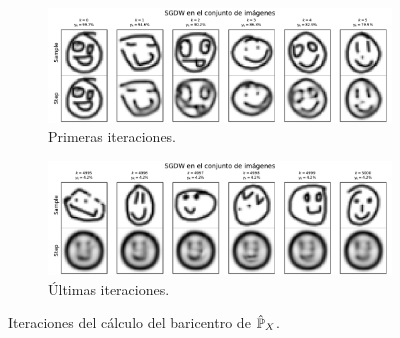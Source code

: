 \begin{figure}[H]
    \centering
    \begin{subfigure}[b]{0.75\textwidth}
        \includegraphics[width=\textwidth]{img/sgdw-iters/first-iters-DS.pdf}
        \caption{Primeras iteraciones.}
        \label{fig:first-iters-DS}
    \end{subfigure}
    \begin{subfigure}[b]{0.75\textwidth}
        \includegraphics[width=\textwidth]{img/sgdw-iters/last-iters-DS.pdf}
        \caption{Últimas iteraciones.}
        \label{fig:last-iters-DS}
    \end{subfigure}
    \caption{Iteraciones del cálculo del baricentro de $\hat\Prob_X$.}
    \label{fig:iters-DS}
\end{figure}

